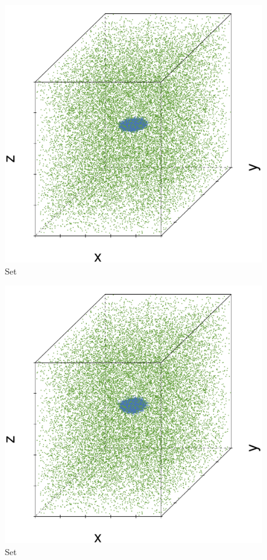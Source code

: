 \begin{subfigure}{0.18\textwidth}
	\centering
	\includegraphics[width=\textwidth]{3/img/datasetplot_baakman_5_60000.pdf}
	\caption{Set \baakmanFive}
	\label{fig:3:simulated:datasets:baakman5}
\end{subfigure}		
\begin{subfigure}{0.18\textwidth}
	\centering
	\includegraphics[width=\textwidth]{3/img/datasetplot_baakman_1_60000.pdf}
	\caption{Set \baakmanOne}
	\label{fig:3:simulated:datasets:baakman1}
\end{subfigure}
